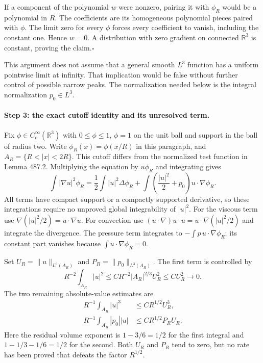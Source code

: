 \documentclass[11pt]{article}
\begin{document}
If a component of the polynomial $w$ were nonzero, pairing it with
$\phi_R$ would be a polynomial in $R$. The coefficients are its
homogeneous polynomial pieces paired with $\phi$. The limit zero for
every $\phi$ forces every coefficient to vanish, including the constant
one. Hence $w=0$. A distribution with zero gradient on connected
$\mathbb R^3$ is constant, proving the claim.\hfill$\square$

This argument does not assume that a general smooth $L^3$ function has a
uniform pointwise limit at infinity. That implication would be false
without further control of possible narrow peaks. The normalization
needed below is the integral normalization $p_0\in L^3$.

\paragraph{Step 3: the exact cutoff identity and its unresolved term.}
Fix $\phi\in C_c^\infty(\mathbb R^3)$ with $0\leq\phi\leq1$,
$\phi=1$ on the unit ball and support in the ball of radius two.
Write $\phi_R(x)=\phi(x/R)$ in this paragraph, and
$A_R=\{R<|x|<2R\}$. This cutoff differs from the normalized test
function in Lemma 487.2. Multiplying the equation by $u\phi_R$ and
integrating gives
\begin{equation}\label{ra487:energy}
 \int |\nabla u|^2\phi_R
 =\frac12\int |u|^2\Delta\phi_R
     +\int\left(\frac{|u|^2}{2}+p_0\right)u\cdot\nabla\phi_R.
\end{equation}
All terms have compact support or a compactly supported derivative, so
these integrations require no unproved global integrability of $|u|^2$.
For the viscous term use
$\nabla(|u|^2/2)=u\cdot\nabla u$. For convection use
$(u\cdot\nabla)u\cdot u=u\cdot\nabla(|u|^2/2)$ and integrate the
divergence. The pressure term integrates to
$-\int p\,u\cdot\nabla\phi_R$; its constant part vanishes because
$\int u\cdot\nabla\phi_R=0$.

Set $U_R=\|u\|_{L^6(A_R)}$ and $P_R=\|p_0\|_{L^3(A_R)}$.
The first term is controlled by
\begin{equation}\label{ra487:diffusion}
 R^{-2}\int_{A_R}|u|^2
 \leq C R^{-2}|A_R|^{2/3}U_R^2
 \leq C U_R^2\longrightarrow0.
\end{equation}
The two remaining absolute-value estimates are
\begin{align}
 R^{-1}\int_{A_R}|u|^3
       &\leq C R^{1/2}U_R^3,\label{ra487:convection}\\
 R^{-1}\int_{A_R}|p_0||u|
       &\leq C R^{1/2}P_R U_R.\label{ra487:pressureflux}
\end{align}
Here the residual volume exponent is
$1-3/6=1/2$ for the first integral and
$1-1/3-1/6=1/2$ for the second. Both $U_R$ and $P_R$ tend to zero,
but no rate has been proved that defeats the factor $R^{1/2}$.
\end{document}

